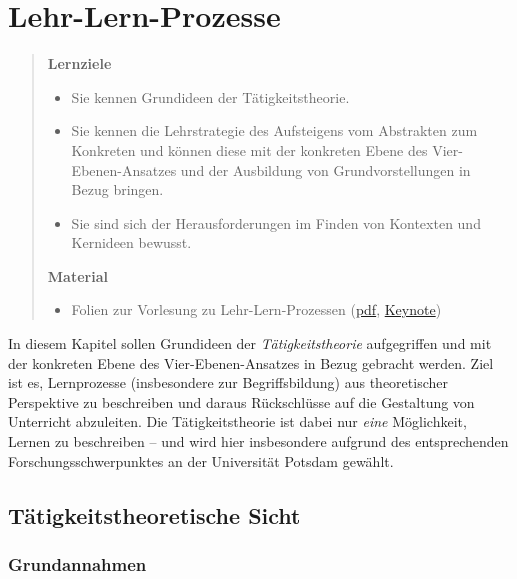 \documentclass[
  ngerman,
]{scrbook}
\providecommand{\tightlist}{%
  \setlength{\itemsep}{0pt}\setlength{\parskip}{0pt}}
\theoremstyle{definition}
\theoremstyle{definition}
\theoremstyle{definition}
\theoremstyle{definition}
\theoremstyle{remark}
\begin{document}
\hypertarget{lehr-lern-prozesse}{%
\chapter{Lehr-Lern-Prozesse}\label{lehr-lern-prozesse}}

\begin{quote}
\textbf{Lernziele}

\begin{itemize}
\tightlist
\item
  Sie kennen Grundideen der Tätigkeitstheorie.
\item
  Sie kennen die Lehrstrategie des Aufsteigens vom Abstrakten zum Konkreten und können diese mit der konkreten Ebene des Vier-Ebenen-Ansatzes und der Ausbildung von Grundvorstellungen in Bezug bringen.
\item
  Sie sind sich der Herausforderungen im Finden von Kontexten und Kernideen bewusst.
\end{itemize}

\textbf{Material}

\begin{itemize}
\tightlist
\item
  Folien zur Vorlesung zu Lehr-Lern-Prozessen (\href{files/Stoffdidaktik-WiSe2122-Kap7.pdf}{pdf}, \href{files/Stoffdidaktik-WiSe2122-Kap7.key}{Keynote})
\end{itemize}
\end{quote}

In diesem Kapitel sollen Grundideen der \emph{Tätigkeitstheorie} aufgegriffen und mit der konkreten Ebene des Vier-Ebenen-Ansatzes in Bezug gebracht werden. Ziel ist es, Lernprozesse (insbesondere zur Begriffsbildung) aus theoretischer Perspektive zu beschreiben und daraus Rückschlüsse auf die Gestaltung von Unterricht abzuleiten. Die Tätigkeitstheorie ist dabei nur \emph{eine} Möglichkeit, Lernen zu beschreiben -- und wird hier insbesondere aufgrund des entsprechenden Forschungsschwerpunktes an der Universität Potsdam gewählt.

\hypertarget{tuxe4tigkeitstheoretische-sicht}{%
\section{Tätigkeitstheoretische Sicht}\label{tuxe4tigkeitstheoretische-sicht}}

\hypertarget{grundannahmen}{%
\subsection{Grundannahmen}\label{grundannahmen}}
\end{document}
